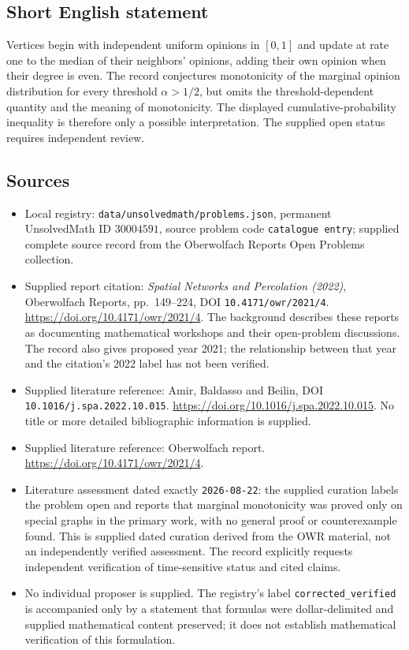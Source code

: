 \documentclass[11pt]{article}
\begin{document}
\subsection{Short English statement}
Vertices begin with independent uniform opinions in \([0,1]\) and update at rate one to the median of their neighbors' opinions, adding their own opinion when their degree is even. The record conjectures monotonicity of the marginal opinion distribution for every threshold \(\alpha>1/2\), but omits the threshold-dependent quantity and the meaning of monotonicity. The displayed cumulative-probability inequality is therefore only a possible interpretation. The supplied open status requires independent review.
\subsection{Sources}
\begin{itemize}
\item Local registry: \texttt{data/unsolvedmath/problems.json}, permanent UnsolvedMath ID \(30004591\), source problem code \texttt{catalogue entry}; supplied complete source record from the Oberwolfach Reports Open Problems collection.
\item Supplied report citation: \emph{Spatial Networks and Percolation (2022)}, Oberwolfach Reports, pp.~149--224, DOI \texttt{10.4171/owr/2021/4}. \url{https://doi.org/10.4171/owr/2021/4}. The background describes these reports as documenting mathematical workshops and their open-problem discussions. The record also gives proposed year 2021; the relationship between that year and the citation's 2022 label has not been verified.
\item Supplied literature reference: Amir, Baldasso and Beilin, DOI \texttt{10.1016/j.spa.2022.10.015}. \url{https://doi.org/10.1016/j.spa.2022.10.015}. No title or more detailed bibliographic information is supplied.
\item Supplied literature reference: Oberwolfach report. \url{https://doi.org/10.4171/owr/2021/4}.
\item Literature assessment dated exactly \texttt{2026-08-22}: the supplied curation labels the problem open and reports that marginal monotonicity was proved only on special graphs in the primary work, with no general proof or counterexample found. This is supplied dated curation derived from the OWR material, not an independently verified assessment. The record explicitly requests independent verification of time-sensitive status and cited claims.
\item No individual proposer is supplied. The registry's label \texttt{corrected\_verified} is accompanied only by a statement that formulas were dollar-delimited and supplied mathematical content preserved; it does not establish mathematical verification of this formulation.
\end{itemize}
\end{document}
